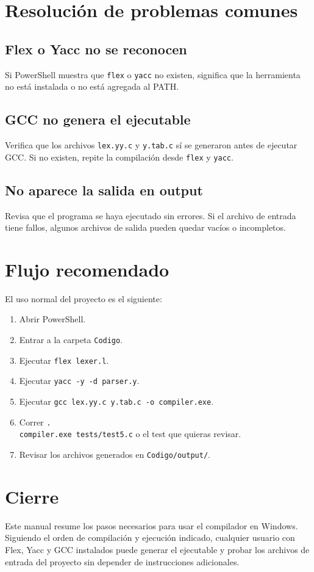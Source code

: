 \documentclass[12pt]{article}
\begin{document}
\section{Resolución de problemas comunes}
\subsection{Flex o Yacc no se reconocen}
Si PowerShell muestra que \texttt{flex} o \texttt{yacc} no existen, significa que la herramienta no está instalada o no está agregada al PATH.

\subsection{GCC no genera el ejecutable}
Verifica que los archivos \texttt{lex.yy.c} y \texttt{y.tab.c} sí se generaron antes de ejecutar GCC. Si no existen, repite la compilación desde \texttt{flex} y \texttt{yacc}.

\subsection{No aparece la salida en output}
Revisa que el programa se haya ejecutado sin errores. Si el archivo de entrada tiene fallos, algunos archivos de salida pueden quedar vacíos o incompletos.

\section{Flujo recomendado}
El uso normal del proyecto es el siguiente:
\begin{enumerate}[label={\arabic*.}]
    \item Abrir PowerShell.
    \item Entrar a la carpeta \texttt{Codigo}.
    \item Ejecutar \texttt{flex lexer.l}.
    \item Ejecutar \texttt{yacc -y -d parser.y}.
    \item Ejecutar \texttt{gcc lex.yy.c y.tab.c -o compiler.exe}.
    \item Correr \texttt{.\\compiler.exe tests/test5.c} o el test que quieras revisar.
    \item Revisar los archivos generados en \texttt{Codigo/output/}.
\end{enumerate}

\section{Cierre}
Este manual resume los pasos necesarios para usar el compilador en Windows. Siguiendo el orden de compilación y ejecución indicado, cualquier usuario con Flex, Yacc y GCC instalados puede generar el ejecutable y probar los archivos de entrada del proyecto sin depender de instrucciones adicionales.
\end{document}
